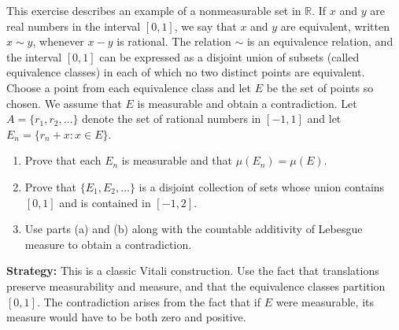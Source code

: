 \begin{problembox}
\begin{problemstatement}
This exercise describes an example of a nonmeasurable set in $\mathbb{R}$. If $x$ and $y$ are real numbers in the interval $[0, 1]$, we say that $x$ and $y$ are equivalent, written $x \sim y$, whenever $x - y$ is rational. The relation $\sim$ is an equivalence relation, and the interval $[0, 1]$ can be expressed as a disjoint union of subsets (called equivalence classes) in each of which no two distinct points are equivalent. Choose a point from each equivalence class and let $E$ be the set of points so chosen. We assume that $E$ is measurable and obtain a contradiction. Let $A = \{r_1, r_2, \ldots \}$ denote the set of rational numbers in $[-1, 1]$ and let $E_n = \{r_n + x : x \in E\}$.
\begin{enumerate}[label=(\alph*)]
\item Prove that each $E_n$ is measurable and that $\mu(E_n) = \mu(E)$.
\item Prove that $\{E_1, E_2, \ldots \}$ is a disjoint collection of sets whose union contains $[0, 1]$ and is contained in $[-1, 2]$.
\item Use parts (a) and (b) along with the countable additivity of Lebesgue measure to obtain a contradiction.
\end{enumerate}
\end{problemstatement}
\end{problembox}

\noindent\textbf{Strategy:} This is a classic Vitali construction. Use the fact that translations preserve measurability and measure, and that the equivalence classes partition $[0,1]$. The contradiction arises from the fact that if $E$ were measurable, its measure would have to be both zero and positive.

